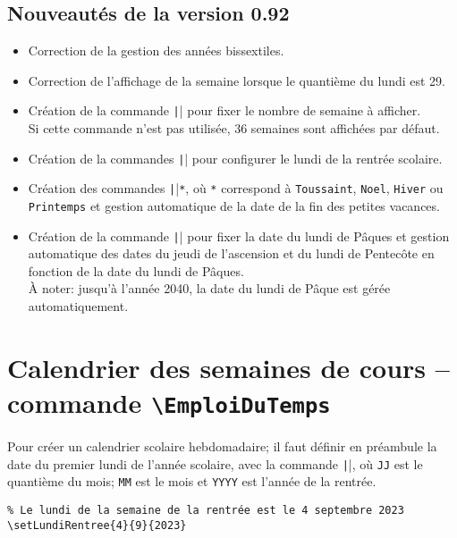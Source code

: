 \documentclass[a4paper,french,10pt]{article}
\begin{document}
\subsection*{Nouveautés de la version 0.92}
\begin{itemize}
  \item Correction de la gestion des années bissextiles.
  \item Correction de l'affichage de la semaine lorsque le quantième du lundi
    est 29.
  \item Création de la commande \texttt|\setNombreSemaines| pour
    fixer le nombre de semaine à afficher.\\
    Si cette commande n'est pas utilisée, 36 semaines sont affichées par défaut.
  \item Création de la commandes \texttt|\setRentree| pour configurer
    le lundi de la rentrée scolaire.
  \item Création des commandes \texttt|\setDebut|\texttt{*}, où
    \texttt{*} correspond à \texttt{Toussaint}, \texttt{Noel}, \texttt{Hiver} ou
    \texttt{Printemps} et gestion automatique de la date de la fin des petites
    vacances.
  \item Création de la commande \texttt|\setLundiPaques| pour
    fixer la date du lundi de Pâques et gestion automatique des dates du jeudi
    de l'ascension et du lundi de Pentecôte en fonction de la date du lundi de
    Pâques.\\
    À noter: jusqu'à l'année 2040, la date du lundi de Pâque est gérée
    automatiquement.
\end{itemize}

\vfil
\begin{center}
  \begin{minipage}{.8\linewidth}
    \begin{tcolorbox}[colback=white, colframe=green!75!black]
      \tableofcontents
    \end{tcolorbox}
  \end{minipage}
\end{center}
\vfil

\newpage

\section{Calendrier des semaines de cours -- 
  commande \texttt{\textbackslash{}EmploiDuTemps}}
Pour créer un calendrier scolaire hebdomadaire; il faut définir en préambule la
date du premier lundi de l'année scolaire, avec la commande 
\texttt||, où \texttt{JJ} est le
quantième du mois; \texttt{MM} est le mois et \texttt{YYYY} est l'année de la
rentrée.
\begin{verbatim}
% Le lundi de la semaine de la rentrée est le 4 septembre 2023
\setLundiRentree{4}{9}{2023}
\end{verbatim}
\end{document}
